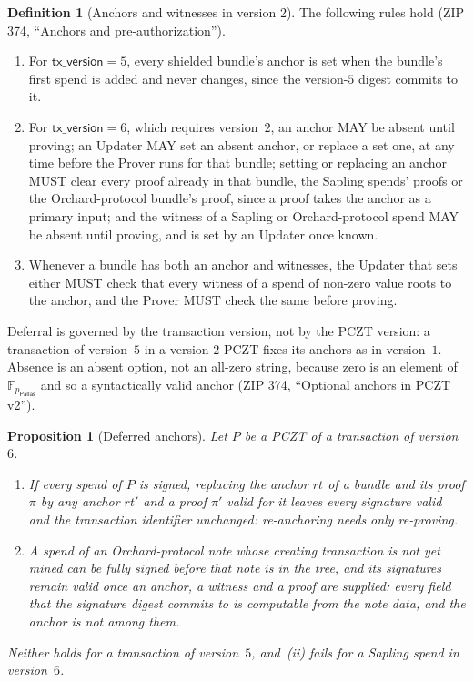 \documentclass[11pt,a4paper]{article}
\newtheorem{proposition}[theorem]{Proposition}
\theoremstyle{definition}
\newtheorem{definition}[theorem]{Definition}
\newcommand{\F}{\mathbb{F}}
\newcommand{\Pallas}{\ensuremath{\mathsf{Pallas}}}
\begin{document}
\begin{definition}[Anchors and witnesses in version 2]\label{def:pczt-v2}
The following rules hold (ZIP 374, ``Anchors and pre-authorization'').
\begin{enumerate}[label=(\roman*)]
\item For $\mathsf{tx\_version} = 5$, every shielded bundle's anchor is set
  when the bundle's first spend is added and never changes, since the
  version-$5$ digest commits to it.
\item For $\mathsf{tx\_version} = 6$, which requires version~$2$, an anchor
  MAY be absent until proving; an Updater MAY set an absent anchor, or
  replace a set one, at any time before the Prover runs for that bundle;
  setting or replacing an anchor MUST clear every proof already in that
  bundle, the Sapling spends' proofs or the Orchard-protocol bundle's
  proof, since a proof takes the anchor as a primary input; and the witness
  of a Sapling or Orchard-protocol spend MAY be absent until proving, and is
  set by an Updater once known.
\item Whenever a bundle has both an anchor and witnesses, the Updater that
  sets either MUST check that every witness of a spend of non-zero value
  roots to the anchor, and the Prover MUST check the same before proving.
\end{enumerate}
Deferral is governed by the transaction version, not by the PCZT version: a
transaction of version~$5$ in a version-$2$ PCZT fixes its anchors as in
version~$1$. Absence is an absent option, not an all-zero string, because
zero is an element of $\F_{p_{\Pallas}}$ and so a syntactically valid
anchor (ZIP 374, ``Optional anchors in PCZT v2'').
\end{definition}

\begin{proposition}[Deferred anchors]\label{prop:pczt-defer}
Let $P$ be a PCZT of a transaction of version~$6$.
\begin{enumerate}[label=(\roman*)]
\item If every spend of $P$ is signed, replacing the anchor $\mathit{rt}$ of
  a bundle and its proof $\pi$ by any anchor $\mathit{rt}'$ and a proof
  $\pi'$ valid for it leaves every signature valid and the transaction
  identifier unchanged: re-anchoring needs only re-proving.
\item A spend of an Orchard-protocol note whose creating transaction is not
  yet mined can be fully signed before that note is in the tree, and its
  signatures remain valid once an anchor, a witness and a proof are
  supplied: every field that the signature digest commits to is computable
  from the note data, and the anchor is not among them.
\end{enumerate}
Neither holds for a transaction of version~$5$, and~(ii) fails for a
Sapling spend in version~$6$.
\end{proposition}
\end{document}
